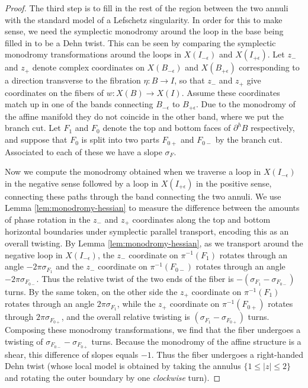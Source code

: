 \documentclass[12pt]{amsart}
\begin{document}
\begin{proof}

The third step is to fill in the rest of the region between the two annuli with the standard model of a
Lefschetz singularity. In order for this to make sense, we need the
symplectic monodromy around the loop in the base being filled in to be
a Dehn twist. This can be seen by comparing the symplectic monodromy
transformations around the loops in $X(I_{-\epsilon})$ and
$X(I_{+\epsilon})$. Let $z_{-}$ and $z_{+}$ denote complex coordinates
on $X(B_{-\epsilon})$ and $X(B_{+\epsilon})$ corresponding to a direction transverse to the fibration $\eta : B \to I$, so that $z_{-}$ and $z_{+}$ give coordinates on the fibers of $w: X(B)\to X(I)$. Assume these
coordinates match up in one of the bands connecting $B_{-\epsilon}$ to
$B_{+\epsilon}$. Due to the monodromy of the affine manifold they do
not coincide in the other band, where we put the branch cut. Let $F_1$
and $F_0$ denote the top and bottom faces of $\partial^h B$
respectively, and suppose that $F_0$ is split into two parts $F_{0+}$
and $F_{0-}$ by the branch cut. Associated to each of these we have a
slope $\sigma_F$.

Now we compute the monodromy obtained when we traverse a loop in $X(I_{-\epsilon})$ in the negative sense
followed by a loop in $X(I_{+\epsilon})$ in the positive sense,
connecting these paths through the band connecting the two annuli. We use Lemma \ref{lem:monodromy-hessian} to measure the difference between the amounts of phase
rotation in the $z_{-}$ and $z_{+}$ coordinates along the top and
bottom horizontal boundaries under symplectic parallel transport,
encoding this as an overall twisting. By Lemma \ref{lem:monodromy-hessian}, as we transport around the
negative loop in $X(I_{-\epsilon})$, the $z_{-}$ coordinate on
$\pi^{-1}(F_1)$ rotates through an angle $-2\pi\sigma_{F_1}$ and the $z_{-}$ coordinate on $\pi^{-1}(F_{0-})$ rotates through an angle $-2\pi\sigma_{F_{0-}}$. Thus the relative twist of the two ends of the fiber is $-(\sigma_{F_1} - \sigma_{F_{0-}})$ turns. By the same token, on the other
side the $z_+$ coordinate on $\pi^{-1}(F_1)$ rotates through an angle $2\pi\sigma_{F_1}$, while the $z_+$ coordinate on $\pi^{-1}(F_{0+})$ rotates through $2\pi\sigma_{F_{0+}}$, and the overall relative twisting is $(\sigma_{F_1} -
\sigma_{F_{0+}})$ turns. Composing these monodromy transformations, we find that the fiber undergoes a twisting of
$\sigma_{F_{0-}}-\sigma_{F_{0+}}$ turns. Because the monodromy of the affine
structure is a shear, this difference of slopes equals $-1$. Thus the fiber undergoes a right-handed Dehn twist (whose local model is obtained by taking the annulus $\{1\leq |z|\leq 2\}$ and rotating the outer boundary by one \emph{clockwise} turn).


\end{proof}
\end{document}
